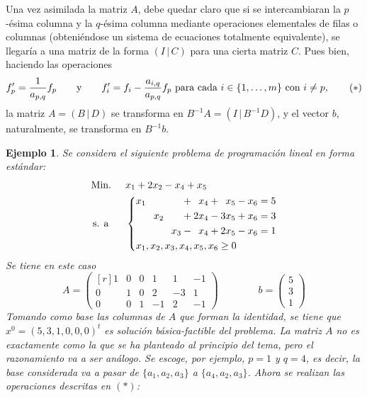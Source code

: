 \documentclass[11pt]{report}
\theoremstyle{mytheorem}
\theoremstyle{mydefinition}
\theoremstyle{myexample}
\newtheorem*{example}{Ejemplo}
\begin{document}
Una vez asimilada la matriz $A$, debe quedar claro que si se intercambiaran la $p$-ésima columna y la $q$-ésima columna mediante operaciones elementales de filas o columnas (obteniéndose un sistema de ecuaciones totalmente equivalente), se llegaría a una matriz de la forma $(I \, | \, C)$ para una cierta matriz $C$. Pues bien, haciendo las operaciones
\[f_p' = \frac{1}{a_{p,q}}f_p \qquad \textup{y} \qquad f_i' = f_i -\frac{a_{i,q}}{a_{p,q}}f_p \textup{ para cada } i \in \{1,\mathellipsis,m\} \textup{ con } i \neq p, \tag{$\ast$}\]
la matriz $A = (B \, | \, D)$ se transforma en $ B^{-1}A = (I \, | \, B^{-1}D)$, y el vector $b$, naturalmente, se transforma en $B^{-1}b$.

\begin{example}
\label{ex2.1.}
Se considera el siguiente problema de programación lineal en forma estándar:
\[\begin{aligned}[t]
&\text{Min. } && x_1+2x_2-x_4+x_5 \\
& \, \text{s. a} && \left\{\begin{alignedat}{10}
& x_1 & {}\phantom{+}{} &     &     &     & {}+{} &  &x_4 & {}+{} &  &x_5 & {}-{} & x_6 {}={} 5 \\
&     &     & x_2 &     &     & {}+{} & 2&x_4 & {}-{} & 3&x_5 & {}+{} & x_6 {}={} 3 \\
&     &     &     & {}\phantom{+}{}    & x_3 & {}-{} &  &x_4 & {}+{} & 2&x_5 & {}-{} & x_6 {}={} 1 \\
& \mathrlap{x_1, x_2,x_3,x_4,x_5,x_6 \geq 0} \\
\end{alignedat}\right.
\end{aligned}\]
Se tiene en este caso
\[ A= \begin{pmatrix*}[r]
    1 & 0 & 0 & 1 & 1 & -1 \\
    0 & 1 & 0 & 2 & -3 & 1 \\
    0 & 0 & 1 & -1 & 2 & -1
\end{pmatrix*}\qquad \qquad
b = \begin{pmatrix}
    5 \\
    3 \\
    1
\end{pmatrix}\] 
Tomando como base las columnas de $A$ que forman la identidad, se tiene que $x^0 = (5,3,1,0,0,0)^t$ es solución básica-factible del problema. La matriz $A$ no es exactamente como la que se ha planteado al principio del tema, pero el razonamiento va a ser análogo. Se escoge, por ejemplo, $p = 1$ y $q = 4$, es decir, la base considerada va a pasar de $\{a_1,a_2,a_3\}$ a $\{a_4,a_2,a_3\}$. Ahora se realizan las operaciones descritas en $(*)$:

\end{example}
\end{document}
